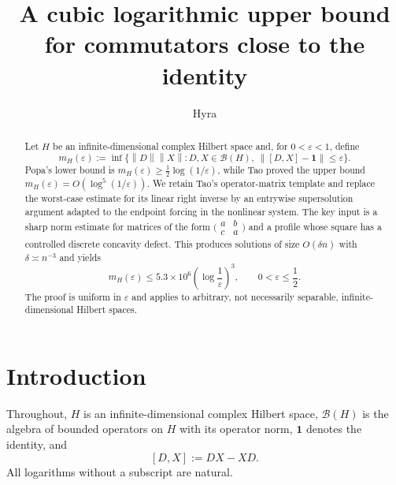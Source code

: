 \documentclass[11pt]{amsart}
\title[A cubic logarithmic upper bound]{A cubic logarithmic upper bound for commutators close to the identity}
\author{Hyra}
\date{}
\numberwithin{equation}{section}
\theoremstyle{remark}
\newcommand{\one}{\mathbf 1}
\newcommand{\norm}[1]{\left\lVert #1\right\rVert}
\begin{document}
\begin{abstract}
Let $H$ be an infinite-dimensional complex Hilbert space and, for
$0<\varepsilon<1$, define
\[
 m_H(\varepsilon)
 :=\inf\bigl\{\norm D\norm X:
 D,X\in\mathcal B(H),\ \norm{[D,X]-\one}\leq\varepsilon\bigr\}.
\]
Popa's lower bound is
$m_H(\varepsilon)\geq \frac12\log(1/\varepsilon)$, while Tao proved the
upper bound $m_H(\varepsilon)=O(\log^5(1/\varepsilon))$.  We retain Tao's
operator-matrix template and replace the worst-case estimate for its linear
right inverse by an entrywise supersolution argument adapted to the endpoint
forcing in the nonlinear system.  The key input is a sharp norm estimate for
matrices of the form $\bigl(\begin{smallmatrix}a&b\\c&a\end{smallmatrix}\bigr)$
and a profile whose square has a controlled discrete concavity defect.  This
produces solutions of size $O(\delta n)$ with $\delta\asymp n^{-3}$ and yields
\[
 m_H(\varepsilon)
 \leq 5.3\times10^6\left(\log\frac1\varepsilon\right)^3,
 \qquad 0<\varepsilon\leq\frac12.
\]
The proof is uniform in $\varepsilon$ and applies to arbitrary, not
necessarily separable, infinite-dimensional Hilbert spaces.
\end{abstract}

\maketitle

\section{Introduction}

Throughout, $H$ is an infinite-dimensional complex Hilbert space,
$\mathcal B(H)$ is the algebra of bounded operators on $H$ with its operator
norm, $\one$ denotes the identity, and
\[
 [D,X]:=DX-XD.
\]
All logarithms without a subscript are natural.
\end{document}
